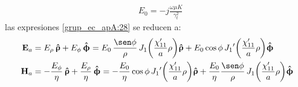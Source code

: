 \begin{align}
&E_0 = - j\frac{\omega\mu K}{\gamma_t^2}
\label{ec_apA:137}
\end{align}
las expresiones \eqref{grup_ec_apA:28} se reducen a:
\begin{subequations}
\label{grup_ec_apA:29}
\begin{align}
\mathbf{E}_a &= E_{\rho}\,\versor{\uprho} + E_{\phi}\,\versor{\upphi} = E_0\,\dfrac{\sen\phi}{\rho}\,J_1\!\left(\dfrac{\chi '_{11}}{a}\rho\right)\!\versor{\uprho} + E_0\cos\phi\,{J_1}'\!\left(\dfrac{\chi '_{11}}{a}\rho\right)\!\versor{\upphi}
\label{ec_apA:138}\\
\mathbf{H}_a &= -\dfrac{E_{\phi}}{\eta}\,\versor{\uprho} + \dfrac{E_{\rho}}{\eta}\,\versor{\upphi} = - \dfrac{E_0}{\eta}\cos\phi\,{J_1}'\!\left(\dfrac{\chi '_{11}}{a}\rho\right)\!\versor{\uprho} + \dfrac{E_0}{\eta}\frac{\sen\phi}{\rho}\,J_1\!\left(\dfrac{\chi '_{11}}{a}\rho\right)\!\versor{\upphi}
\label{ec_apA:139}
\end{align}
\end{subequations}
